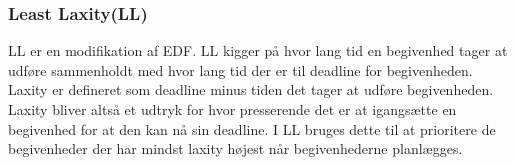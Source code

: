 \subsubsection{Least Laxity(LL)}
LL er en modifikation af EDF. LL kigger på hvor lang tid en begivenhed tager at udføre sammenholdt med hvor lang tid der er til deadline for begivenheden. Laxity er defineret som deadline minus tiden det tager at udføre begivenheden. Laxity bliver altså et udtryk for hvor presserende det er at igangsætte en begivenhed for at den kan nå sin deadline. I LL bruges dette til at prioritere de begivenheder der har mindst laxity højest når begivenhederne planlægges. 
